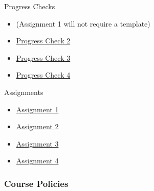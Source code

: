 \documentclass[
]{article}
\providecommand{\tightlist}{%
  \setlength{\itemsep}{0pt}\setlength{\parskip}{0pt}}
\begin{document}
Progress Checks

\begin{itemize}
\tightlist
\item
  (Assignment 1 will not require a template)
\item
  \href{assignment_templates/progress_check_2.rmd}{Progress Check 2}
\item
  \href{assignment_templates/progress_check_3.rmd}{Progress Check 3}
\item
  \href{assignment_templates/progress_check_4.rmd}{Progress Check 4}
\end{itemize}

Assignments

\begin{itemize}
\tightlist
\item
  \href{assignment_templates/assignment_1.rmd}{Assignment 1}
\item
  \href{assignment_templates/assignment_2.rmd}{Assignment 2}
\item
  \href{assignment_templates/assignment_3.rmd}{Assignment 3}
\item
  \href{assignment_templates/assignment_4.rmd}{Assignment 4}
\end{itemize}

\hypertarget{course-policies}{%
\subsubsection{Course Policies}\label{course-policies}}
\end{document}
